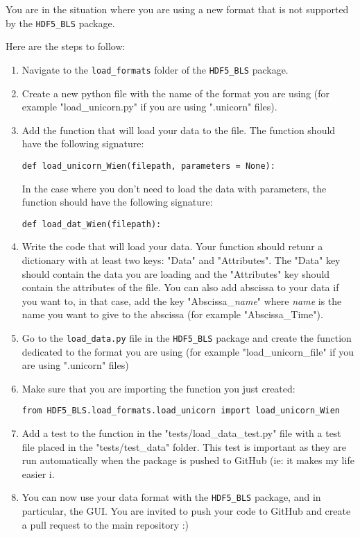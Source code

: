 \begin{tcolorbox}
    You are in the situation where you are using a new format that is not supported by the \texttt{HDF5\_BLS} package.
\end{tcolorbox}

Here are the steps to follow:
\begin{enumerate}
    \item Navigate to the \texttt{load\_formats} folder of the \texttt{HDF5\_BLS} package. 
    \item Create a new python file with the name of the format you are using (for example "load\_unicorn.py" if you are using ".unicorn" files).
    \item Add the function that will load your data to the file. The function should have the following signature:
\begin{lstlisting}
def load_unicorn_Wien(filepath, parameters = None):
\end{lstlisting}
    In the case where you don't need to load the data with parameters, the function should have the following signature:
\begin{lstlisting}
def load_dat_Wien(filepath):
\end{lstlisting}
    \item Write the code that will load your data. Your function should retunr a dictionary with at least two keys: "Data" and "Attributes". The "Data" key should contain the data you are loading and the "Attributes" key should contain the attributes of the file. You can also add abscissa to your data if you want to, in that case, add the key "Abscissa\_\textsl{name}" where \textsl{name} is the name you want to give to the abscissa (for example "Abscissa\_Time").
    \item Go to the \texttt{load\_data.py} file in the \texttt{HDF5\_BLS} package and create the function dedicated to the format you are using (for example "load\_unicorn\_file" if you are using ".unicorn" files)
    \item Make sure that you are importing the function you just created:
\begin{lstlisting}
from HDF5_BLS.load_formats.load_unicorn import load_unicorn_Wien
\end{lstlisting}
    \item Add a test to the function in the "tests/load\_data\_test.py" file with a test file placed in the "tests/test\_data" folder. This test is important as they are run automatically when the package is pushed to GitHub (ie: it makes my life easier ^^). 
    \item You can now use your data format with the \texttt{HDF5\_BLS} package, and in particular, the GUI. You are invited to push your code to GitHub and create a pull request to the main repository :)
\end{enumerate}
